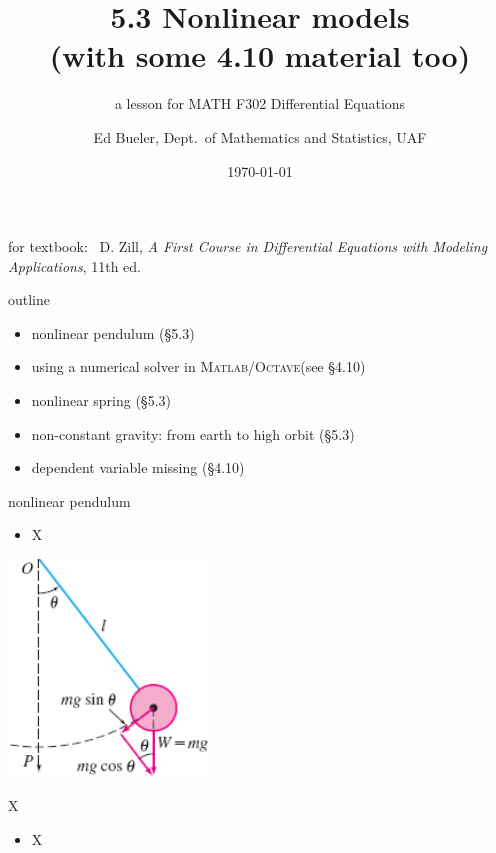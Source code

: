 \documentclass[urlcolor=blue,dvipsnames]{beamer}
\title{5.3 Nonlinear models \\ (with some 4.10 material too)}
\subtitle{a lesson for MATH F302 Differential Equations}
\author{Ed Bueler, Dept.~of Mathematics and Statistics, UAF}
\date{\tiny \today}
\newcommand{\Matlab}{\textsc{Matlab}\xspace}
\newcommand{\Octave}{\textsc{Octave}\xspace}
\begin{document}


\begin{frame}
\titlepage

\centerline{\tiny for textbook: \, D. Zill, \emph{A First Course in Differential Equations with Modeling Applications}, 11th ed.}
\end{frame}


\begin{frame}{outline}

\begin{itemize}
\item nonlinear pendulum (\S 5.3)
\item using a numerical solver in \Matlab/\Octave (see \S4.10)
\item nonlinear spring (\S 5.3)
\item non-constant gravity: from earth to high orbit (\S 5.3)
\item dependent variable missing (\S 4.10)
\end{itemize}
\end{frame}


\begin{frame}{nonlinear pendulum}

\begin{itemize}
\item X
\end{itemize}

\includegraphics[width=0.4\textwidth]{figs/pendulum}
\end{frame}


\begin{frame}{X}

\begin{itemize}
\item X
\end{itemize}
\end{frame}
\end{document}
